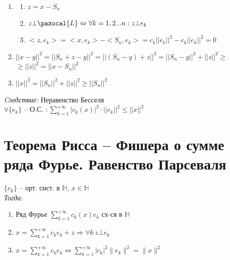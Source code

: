 \documentclass[paper=a4, fontsize=17pt]{article}
\begin{document}
\begin{enumerate}

	\item
	\begin{enumerate}
		\item $z = x - S_n$
		
		\item $z \bot \pazocal{L} \Leftrightarrow \forall k = 1, 2 ...n : z \bot e_k$
		
		\item $<z, e_k> = <x, e_k> - <S_n, e_k> = c_k ||e_k||^2 - c_k ||e_k||^2 = 0$
	\end{enumerate}
	
	\item $||x - y||^2 = ||S_n + z - y||^2 = ||(S_n - y) + z||^2 = ||S_n - y||^2 + ||z||^2 \geqslant$ $\geqslant ||z||^2 = ||x - S_n||^2$
	
	\item $||x||^2 = ||S_n||^2 + ||z||^2 \geqslant ||S_n||^2$
\end{enumerate}

\emph{Cледствие:} Неравенство Бесселя\\

$\forall \{e_k\}$ {{--}} О.С. $:\sum\limits_{k=1}^{+\infty} |c_k(x)|^2 \cdot ||e_k||^2 \leqslant ||x||^2$

\section{Теорема Рисса -- Фишера о сумме ряда Фурье. Равенство Парсеваля}
$\{e_k\}$ -- орт. сист. в $\mathds{H}$, $x \in \mathds{H}$\\

\emph{Тогда}:
\begin{enumerate}
	\item Ряд Фурье $\sum\limits_{k=1}^{+\infty} c_k(x) e_k$ сх-ся в $\mathds{H}$
	\item $x =\sum\limits_{k=1}^{+\infty} c_k e_k + z \Rightarrow \forall k \ z \bot e_k$
	\item $x =\sum\limits_{k=1}^{+\infty} c_k e_k \Leftrightarrow \sum\limits_{k=1}^{+\infty} \vert c_k \vert^2 \|e_k\|^2=\|x\|^2$
\end{enumerate}
\end{document}
